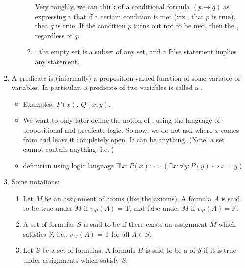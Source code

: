 \documentclass{article}
\begin{document}
\begin{enumerate}
\begin{itemize}
\begin{enumerate}
Very roughly, we can think of a conditional formula $(p \rightarrow q)$ as expressing a  that if a certain condition is met (viz., that $p$ is true), then $q$ is true. If the condition $p$ turns out not to be met, then the , regardless of $q$.
\item {}: the empty set is a subset of any set, and a false statement implies any statement.
        \end{enumerate}
    \end{itemize}
    \item {} A predicate is (informally) a proposition-valued function of some variable or variables. In particular, a predicate of two variables is called a . 
\begin{itemize}
    \item Examples: $P(x)$, $Q(x,y)$.
    \item We want to only later define the notion of , using the language of propositional and predicate logic. So now, we do not ask where $x$ comes from and leave it completely open. It can be anything. (Note, a set cannot contain anything, i.e. )
    \item {} definition using logic language $\exists ! x: P(x): \Leftrightarrow(\exists x: \forall y: P(y) \Leftrightarrow x=y)$
\end{itemize} 
\item Some notations: 
\begin{enumerate}
    \item Let $M$ be an assignment of atoms  (like the axioms). A formula $A$ is said to be true under $M$ if $v_{M}(A)=\mathrm{T}$, and false under $M$ if $v_{M}(A)=\mathrm{F}$. 

\item  A set of formulas $S$ is said to be  if there exists an assignment $M$ which satisfies $S$, i.e., $v_{M}(A)=\mathrm{T}$ for all $A \in S$.

\item Let $S$ be a set of formulas. A formula $B$ is said to be a  of $S$ if it is true under  assignments which satisfy $S$.


\end{enumerate}
\end{enumerate}
\end{document}
